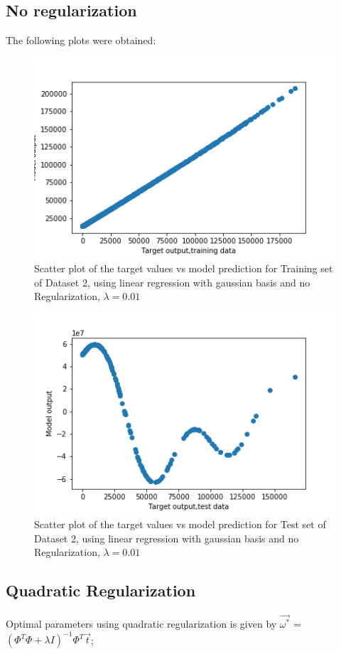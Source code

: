 \documentclass[12pt,a4paper]{article}
\begin{document}
\subsection{No regularization}
The following plots were obtained:
\begin{figure}[H]
     \centering
     \includegraphics[scale=0.5]{images/scatter_ds2noreg.png}
     \caption{Scatter plot of the target values vs model prediction for Training set of Dataset 2, using linear regression with gaussian basis and no Regularization, $\lambda = 0.01 $}
     \label{fig:ds2tr}
\end{figure}
\begin{figure}[H]
    \centering
    \includegraphics[scale=0.5]{images/scatter_ds2noreg_test.png}
    \caption{Scatter plot of the target values vs model prediction for Test set of Dataset 2, using linear regression with gaussian basis and no Regularization, $\lambda = 0.01 $}
\end{figure}


\subsection{Quadratic Regularization}
Optimal parameters using quadratic regularization is given by $\vec{\omega^*}$ = $(\Phi^T\Phi + \lambda I)^{-1} \Phi^T \vec{t}$;\\
\end{document}
